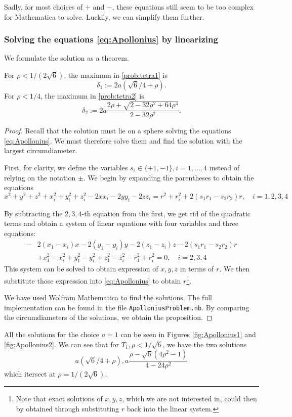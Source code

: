 Sadly, for most choices of $+$ and $-$, these equations still seem to be too complex for Mathematica to solve. Luckily, we can simplify them further. 

\subsubsection{Solving the equations \ref{eq:Apollonius} by linearizing}

We formulate the solution as a theorem.
\begin{theorem}\label{thm:Apollonius}
	For $\rho < 1/(2\sqrt 6)$, the maximum in \ref{prob:tetra1} is
	$$\delta_1 := 2a(\sqrt 6/4 + \rho).$$
	For $\rho < 1/4$, the maximum in \ref{prob:tetra2} is
	$$\delta_2 := 2a \frac{2\rho + \sqrt{2 - 32\rho^2 + 64 \rho^4}}{2-32\rho^2}.$$

\end{theorem}
\begin{proof}
	Recall that the solution must lie on a sphere solving the equations \ref{eq:Apollonius}. We must therefore solve them and find the solution with the largest circumdiameter.

First, for clarity, we define the variables $s_i\in\{+1,-1\},i=1,\dots,4$ instead of relying on the notation $\pm$. We begin by expanding the parentheses to obtain the equations
$$x^2+y^2+z^2 + x_i^2 + y_i^2 + z_i^2 - 2xx_i - 2yy_i - 2zz_i = r^2 + r_i^2 + 2(s_1 r_1 - s_2 r_2)r,\quad i=1,2,3,4$$

By subtracting the $2,3,4$-th equation from the first, we get rid of the quadratic terms and obtain a system of linear equations with four variables and three equations:
\begin{align*}-&2(x_1-x_i)x - 2(y_1-y_i)y -2 (z_1-z_i)z - 2(s_1r_1 - s_2r_2)r \\
	& + x_1^2-x_i^2 + y_1^2-y_i^2 + z_1^2 - z_i^2 -r_1^2 + r_i^2 = 0, \quad i=2,3,4
\end{align*}
This system can be solved to obtain expression of $x,y,z$ in terms of $r$. We then substitute those expression into \ref{eq:Apollonius} to obtain $r$\footnote{Note that exact solutions of $x,y,z$, which we are not interested in, could then by obtained through substituting $r$ back into the linear system.}. 

We have used Wolfram Mathematica \cite{Mathematica} to find the solutions. The full implementation can be found in the file \texttt{ApolloniusProblem.nb}. By comparing the circumdiameters of the solutions, we obtain the proposition.

\end{proof}
All the solutions for the choice $a=1$ can be seen in Figures \ref{fig:Apollonius1} and \ref{fig:Apollonius2}. We can see that for $T_1, \rho < 1/\sqrt 6$, we have the two solutions
$$a(\sqrt 6 / 4 + \rho), a \frac{\rho - \sqrt 6 (4\rho^2 - 1)}{4-24 \rho^2}$$
which itersect at $\rho =1/(2\sqrt 6)$. 


